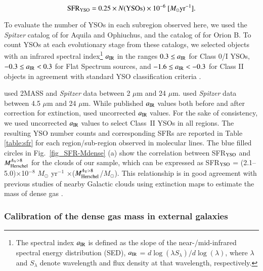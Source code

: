 \documentclass{aa}
\begin{document}
{\begin{equation}
{\rm SFR_{\rm YSO}} = 0.25 \times N({\rm YSOs}) \times 10^{-6} \  [M_{\odot} {\rm yr}^{-1}].
\end{equation}



To evaluate the number of  {YSOs} in each subregion observed here, 
we used the {\it Spitzer} catalog of \citet{Dunham15} for Aquila and Ophiuchus, and the catalog of \citet{Megeath12} for Orion B.  
{To count YSOs at each evolutionary stage from these catalogs, we selected objects with an infrared spectral 
index\footnote{The spectral index $a_{\rm IR}$ is 
defined as the slope of the near-/mid-infrared spectral energy distribution (SED), $a_{\rm IR}$ = $d \log(\lambda S_{\lambda})/d \log(\lambda)$, 
where $\lambda$ and $S_{\lambda}$ denote wavelength and flux density at that wavelength, respectively.}  $a_{\rm IR}$ in the 
ranges $0.3 \le a_{\rm IR}$ for Class 0/I YSOs, $-0.3 \le a_{\rm IR} < 0.3$ for Flat Spectrum sources, and $-1.6 \le a_{\rm IR} < -0.3$ 
for Class II objects in agreement with 
standard YSO classification criteria \citep{Greene94}. }


\citet{Dunham15} used 2MASS and {\it Spitzer} data between 2 $\mu$m and 24 $\mu$m. 
\citet{Megeath12} used {\it Spitzer} data between 4.5 $\mu$m and 24 $\mu$m. 
While \citet{Dunham15} published $a_{\rm IR}$ values both before and after correction for extinction, 
\citet{Megeath12} used uncorrected $a_{\rm IR}$ values. 
For the sake of consistency, we used uncorrected $a_{\rm IR}$ values to select Class~II YSOs in all regions. 
The {resulting YSO number counts} and corresponding SFRs are reported in Table \ref{table:sfr} for each region/sub-region observed in molecular lines.
The blue filled circles in Fig.~\ref{fig_SFR-Mdense} (a) show the correlation between SFR$_{\rm YSO}$ and $M_{\rm Herschel}^{A_{\rm V}>8}$ for the clouds of our sample, 
which can be expressed as {SFR$_{\rm YSO}$ = (2.1--5.0)$\times$10$^{-8}$ $M_{\odot}$ yr$^{-1}$ $\times$($M_{\rm Herschel}^{A_{\rm V}>8}$/$M_{\odot}$)}.
This relationship is in good agreement with previous studies of nearby Galactic clouds using extinction maps to estimate the mass of dense gas 
\citep[][]{Lada10,Lada12, Evans14}. 



\subsubsection{Calibration of the dense gas mass in external galaxies }\label{Sect:calibration}


}
\end{document}
